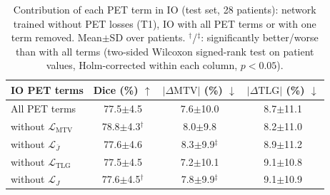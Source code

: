\begin{table}[t]
\centering
\caption{Contribution of each PET term in IO (test set, 28 patients): network trained without PET losses (T1), IO with all PET terms or with one term removed. Mean$\pm$SD over patients. $^{\dagger}$/$^{\ddagger}$: significantly better/worse than with all terms (two-sided Wilcoxon signed-rank test on patient values, Holm-corrected within each column, $p<0.05$).}
\label{tab:loo}
\scriptsize
\setlength{\tabcolsep}{3pt}
\begin{tabular}{lccc}
\toprule
IO PET terms & Dice (\%) $\uparrow$ & $|\Delta\mathrm{MTV}|$ (\%) $\downarrow$ & $|\Delta\mathrm{TLG}|$ (\%) $\downarrow$ \\
\midrule
All PET terms & 77.5$\pm$4.5 & 7.6$\pm$10.0 & 8.7$\pm$11.1 \\
\midrule
without $\mathcal{L}_{\mathrm{MTV}}$ & 78.8$\pm$4.3$^{\dagger}$ & 8.0$\pm$9.8 & 8.2$\pm$11.0 \\
without $\mathcal{L}_{\overline{J}}$ & 77.6$\pm$4.6 & 8.3$\pm$9.9$^{\ddagger}$ & 8.9$\pm$11.2 \\
without $\mathcal{L}_{\mathrm{TLG}}$ & 77.5$\pm$4.5 & 7.2$\pm$10.1 & 9.1$\pm$10.8 \\
without $\mathcal{L}_{J}$ & 77.6$\pm$4.5$^{\dagger}$ & 7.8$\pm$9.9$^{\ddagger}$ & 9.1$\pm$10.9 \\
\bottomrule
\end{tabular}
\end{table}
